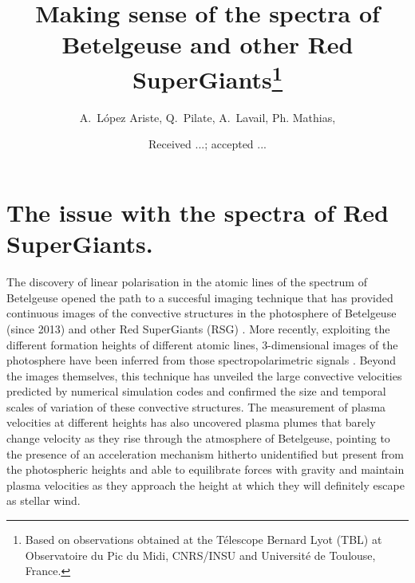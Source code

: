 \documentclass{/Users/art2/TeX/aanda/aa}
\begin{document}
 


   \title{Making sense of the spectra of Betelgeuse and other Red SuperGiants\thanks{Based on observations obtained at the T\'elescope Bernard Lyot
(TBL) at Observatoire du Pic du Midi, CNRS/INSU and Universit\'e de
Toulouse, France.}}

   \author{{ A.~L{\'o}pez Ariste}, { Q.~Pilate},{ A.~Lavail},{ Ph. Mathias},  }
   \date{Received ...; accepted ...}

   

 
  \abstract
  {}
   {}
   {}
   { }
   {}
  
   \keywords{}


   \maketitle
%

\section{The issue with the spectra of Red SuperGiants.}
The discovery of linear polarisation in the atomic lines of the spectrum of Betelgeuse \citep{auriere_discovery_2016}  opened the path to a succesful imaging technique 
that has provided continuous images of the convective structures in the photosphere of Betelgeuse (since 2013) and other Red SuperGiants (RSG) \citep{lopez_ariste_convective_2018}. More recently, exploiting 
the different formation heights of different atomic lines, 3-dimensional images of the photosphere have been inferred from those spectropolarimetric 
signals \citep{lopez_ariste_three-dimensional_2022}. Beyond the images themselves, this technique has unveiled the large convective velocities predicted by numerical simulation codes and confirmed 
the size and temporal scales of variation of these convective structures. The measurement of plasma velocities at different heights has also uncovered 
plasma plumes that barely change velocity as they rise through the atmosphere of Betelgeuse, pointing to the presence of an acceleration mechanism 
hitherto unidentified but present from the photospheric heights and able to equilibrate forces with gravity and maintain plasma velocities as 
they approach the height at which they will definitely escape as stellar wind.
\end{document}
